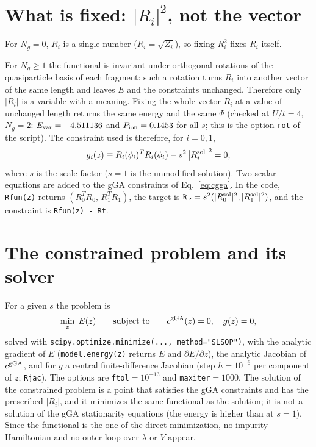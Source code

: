 \documentclass[11pt]{article}
\newcommand{\Ng}{N_g}
\begin{document}
\section{What is fixed: $|R_i|^2$, not the vector}
For $\Ng=0$, $R_i$ is a single number ($R_i=\sqrt{Z_i}$), so fixing $R_i^2$ fixes $R_i$ itself.

For $\Ng\ge1$ the functional is invariant under orthogonal rotations of the quasiparticle basis of each fragment: such a rotation turns $R_i$ into another vector of the same length and leaves $E$ and the constraints unchanged. Therefore only $|R_i|$ is a variable with a meaning. Fixing the whole vector $R_i$ at a value of unchanged length returns the same energy and the same $\Psi$ (checked at $U/t=4$, $\Ng=2$: $E_{\rm var}=-4.511136$ and $P_{\rm ion}=0.1453$ for all $s$; this is the option \texttt{rot} of the script). The constraint used is therefore, for $i=0,1$,
\begin{equation}
g_i(z)\equiv R_i(\phi_i)^{T}R_i(\phi_i)-s^{2}\,\big|R_i^{\rm sol}\big|^{2}=0 ,
\label{eq:cR}
\end{equation}
where $s$ is the scale factor ($s=1$ is the unmodified solution). Two scalar equations are added to the gGA constraints of Eq.~\eqref{eq:cgga}. In the code, \texttt{Rfun(z)} returns $(R_0^TR_0,\,R_1^TR_1)$, the target is $\texttt{Rt}=s^2(|R_0^{\rm sol}|^2,|R_1^{\rm sol}|^2)$, and the constraint is \texttt{Rfun(z) - Rt}.

\section{The constrained problem and its solver}
For a given $s$ the problem is
\begin{equation}
\min_z\;E(z)\qquad\text{subject to}\qquad c^{\rm gGA}(z)=0,\quad g(z)=0 ,
\end{equation}
solved with \texttt{scipy.optimize.minimize(..., method="SLSQP")}, with the analytic gradient of $E$ (\texttt{model.energy(z)} returns $E$ and $\partial E/\partial z$), the analytic Jacobian of $c^{\rm gGA}$, and for $g$ a central finite-difference Jacobian (step $h=10^{-6}$ per component of $z$; \texttt{Rjac}). The options are \texttt{ftol}$=10^{-13}$ and \texttt{maxiter}$=1000$. The solution of the constrained problem is a point that satisfies the gGA constraints and has the prescribed $|R_i|$, and it minimizes the same functional as the solution; it is not a solution of the gGA stationarity equations (the energy is higher than at $s=1$). Since the functional is the one of the direct minimization, no impurity Hamiltonian and no outer loop over $\lambda$ or $V$ appear.
\end{document}
